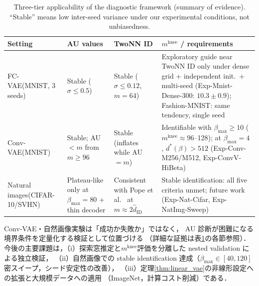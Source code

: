 \documentclass[11pt,a4paper]{jsarticle}
\newcommand{\mknee}{m^{\mathrm{knee}}}
\begin{document}
\begin{table}[H]
\centering
\caption{Three-tier applicability of the diagnostic framework (summary of evidence). ``Stable'' means low inter-seed variance under our experimental conditions, not unbiasedness.}
\label{tab:applicability}
\small
\begin{tabular}{p{2.7cm}p{3.1cm}p{3.3cm}p{5.1cm}}
\toprule
Setting & AU values & TwoNN ID & $\mknee$ / requirements \\
\midrule
FC-VAE\newline (MNIST, 3 seeds) & Stable ($\sigma \leq 0.5$) & Stable ($\sigma \leq 0.12$, $m=64$) &
Exploratory guide near TwoNN ID only under dense grid + independent init.\ + multi-seed
(Exp-Mnist-Dense-300: $10.3 \pm 0.9$); Fashion-MNIST: same tendency, single seed \\
\addlinespace
Conv-VAE\newline (MNIST) & Stable; AU$<m$ from $m \geq 96$ & Stable (inflates while AU$=m$) &
Identifiable with $\beta_{\max} \geq 10$ ($\mknee \approx 96$--128); at $\beta_{\max}=4$, $d^*(\beta) > 512$
(Exp-Conv-M256/M512, Exp-ConvV-HiBeta) \\
\addlinespace
Natural images\newline (CIFAR-10/SVHN) & Plateau-like only at $\beta_{\max}=80$ + thin decoder & Consistent with Pope et al.\ \cite{pope2021intrinsic} at $m \approx 2\hat{d}_\mathrm{ID}$ &
Stable identification: all five criteria unmet; future work
(Exp-Nat-Cifar, Exp-NatImg-Sweep) \\
\bottomrule
\end{tabular}
\end{table}

Conv-VAE・自然画像実験は「成功か失敗か」ではなく，
AU 診断が困難になる境界条件を定量化する検証として位置づける
（詳細な証拠は表\ref{tab:applicability}の各節参照）．
今後の主要課題は，（i）探索窓推定と$\mknee$評価を分離した nested validation による独立検証，
（ii）自然画像での stable identification 達成（$\beta_{\max} \in [40,120]$密スイープ，シード安定性の改善），
（iii）定理\ref{thm:linear_vae}の非線形設定への拡張と大規模データへの適用
（ImageNet，計算コスト削減）である．
\end{document}
